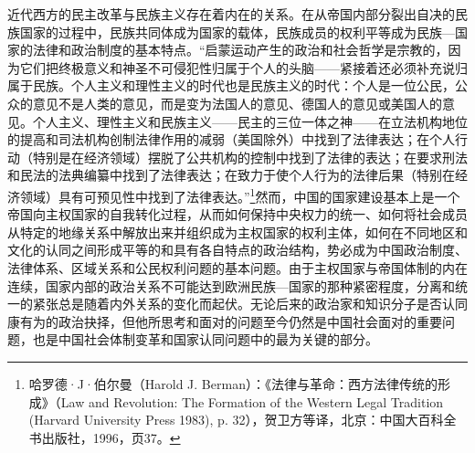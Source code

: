 \documentclass[a4paper, 12pt, openright]{ctexbook}
\begin{document}
近代西方的民主改革与民族主义存在着内在的关系。在从帝国内部分裂出自决的民族国家的过程中，民族共同体成为国家的载体，民族成员的权利平等成为民族—国家的法律和政治制度的基本特点。“启蒙运动产生的政治和社会哲学是宗教的，因为它们把终极意义和神圣不可侵犯性归属于个人的头脑——紧接着还必须补充说归属于民族。个人主义和理性主义的时代也是民族主义的时代：个人是一位公民，公众的意见不是人类的意见，而是变为法国人的意见、德国人的意见或美国人的意见。个人主义、理性主义和民族主义——民主的三位一体之神——在立法机构地位的提高和司法机构创制法律作用的减弱（美国除外）中找到了法律表达；在个人行动（特别是在经济领域）摆脱了公共机构的控制中找到了法律的表达；在要求刑法和民法的法典编纂中找到了法律表达；在致力于使个人行为的法律后果（特别在经济领域）具有可预见性中找到了法律表达。”\footnote{哈罗德·J·伯尔曼（Harold J. Berman）：《法律与革命：西方法律传统的形成》（Law and Revolution: The Formation of the Western Legal Tradition (Harvard University Press 1983), p. 32），贺卫方等译，北京：中国大百科全书出版社，1996，页37。}然而，中国的国家建设基本上是一个帝国向主权国家的自我转化过程，从而如何保持中央权力的统一、如何将社会成员从特定的地缘关系中解放出来并组织成为主权国家的权利主体，如何在不同地区和文化的认同之间形成平等的和具有各自特点的政治结构，势必成为中国政治制度、法律体系、区域关系和公民权利问题的基本问题。由于主权国家与帝国体制的内在连续，国家内部的政治关系不可能达到欧洲民族—国家的那种紧密程度，分离和统一的紧张总是随着内外关系的变化而起伏。无论后来的政治家和知识分子是否认同康有为的政治抉择，但他所思考和面对的问题至今仍然是中国社会面对的重要问题，也是中国社会体制变革和国家认同问题中的最为关键的部分。
\end{document}
